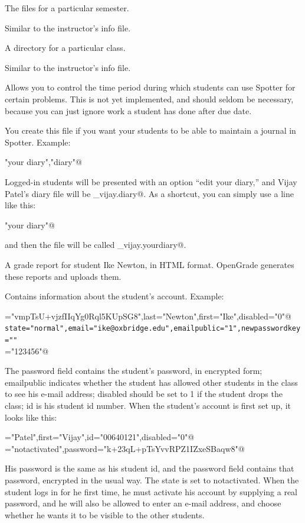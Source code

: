 \documentclass{doc}
\begin{document}
 The files for a particular semester.

 Similar to the instructor's info file.

 A directory for a particular class.

 Similar to the instructor's info file.

 Allows you to control the time period during which students can use
Spotter for certain problems. This is not yet implemented, and should seldom be
necessary, because you can just ignore work a student has done after
due date.

 You create this file if you want your students to be able to
maintain a journal in Spotter. Example:

\verb@"your diary","diary"@

\noindent Logged-in students will be presented with an option ``edit your diary,''
and Vijay Patel's diary file will be \verb@patel_vijay.diary@.
As a shortcut, you can simply use a line like this:

\verb@"your diary"@

\noindent and then the file will be called \verb@patel_vijay.yourdiary@.

 A grade report for student Ike Newton, in HTML
format. OpenGrade generates these reports and uploads them.

 Contains information about the student's account.
Example:

\verb@password="vmpTsU+vjzfIIqYg0Rql5KUpSG8",last="Newton",first="Ike",disabled="0"@\\
\verb|state="normal",email="ike@oxbridge.edu",emailpublic="1",newpasswordkey=""|\\
\verb@id="123456"@

The password field contains the student's password, in encrypted form; emailpublic
indicates whether the student has allowed other students in the class to see his
e-mail address; disabled should be set to 1 if the student drops the class; id
is his student id number. When the student's account is first set up, it looks like
this:

\verb@last="Patel",first="Vijay",id="00640121",disabled="0"@\\
\verb@state="notactivated",password="k+23qL+pTsYvvRPZ1IZxeSBaqw8"@

His password is the same as his student id, and the password field contains that
password, encrypted in the usual way. The state is set to notactivated. When the
student logs in for he first time, he must activate his account by supplying a
real password, and he will also be allowed to enter an e-mail address, and choose
whether he wants it to be visible to the other students.
\end{document}
